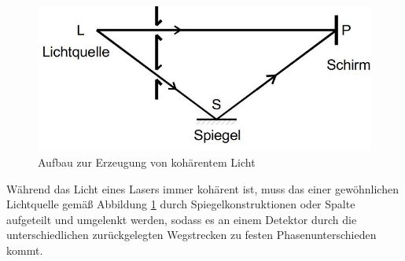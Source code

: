 \begin{figure}
\centering
\includegraphics[scale=0.5]{content/images/kohaerenz.jpg}
\caption{Aufbau zur Erzeugung von kohärentem Licht\cite{V401}}
\label{fig:Kohärenz}
\end{figure}
Während das Licht eines Lasers immer kohärent ist, muss das einer gewöhnlichen Lichtquelle gemäß Abbildung \ref{fig:Kohärenz} durch Spiegelkonstruktionen oder Spalte aufgeteilt und umgelenkt werden, sodass es an einem Detektor durch die unterschiedlichen zurückgelegten Wegstrecken zu festen Phasenunterschieden kommt.
